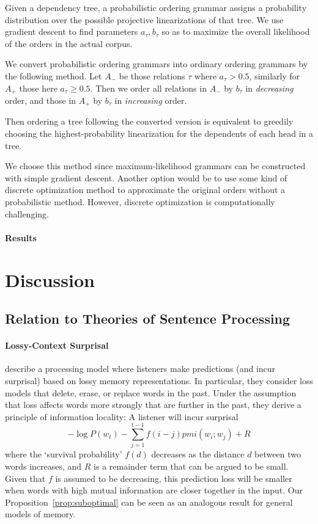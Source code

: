 \documentclass[11pt,letterpaper]{article}
\begin{document}
Given a dependency tree, a probabilistic ordering grammar assigns a probability distribution over the possible projective linearizations of that tree.
We use gradient descent to find parameters $a_\tau, b_\tau$ so as to maximize the overall likelihood of the orders in the actual corpus.


We convert probabilistic ordering grammars into ordinary ordering grammars by the following method.
Let $A_-$ be those relations $\tau$ where $a_\tau > 0.5$, similarly for $A_+$ those here $a_\tau \geq 0.5$.
Then we order all relations in $A_-$ by $b_\tau$ in \emph{decreasing} order, and those in $A_+$ by $b_\tau$ in \emph{increasing} order.

Then ordering a tree following the converted version is equivalent to greedily choosing the highest-probability linearization for the dependents of each head in a tree.


We choose this method since maximum-likelihood grammars can be constructed with simple gradient descent.
Another option would be to use some kind of discrete optimization method to approximate the original orders without a probabilistic method.
However, discrete optimization is computationally challenging.

\paragraph{Results}


\section{Discussion}

\subsection{Relation to Theories of Sentence Processing}


\paragraph{Lossy-Context Surprisal}
\citet{futrell-noisy-context-2017} describe a processing model where listeners make predictions (and incur surprisal) based on lossy memory representations.
In particular, they consider loss models that delete, erase, or replace words in the past.
Under the assumption that loss affects words more strongly that are further in the past, they derive a principle of information locality:
A listener will incur surprisal
$$ -\log P(w_t) - \sum_{j=1}^{t-1} f(i-j) pmi(w_i; w_j) + R$$
where the `survival probability' $f(d)$ decreases as the distance $d$ between two words increases, and $R$ is a remainder term that can be argued to be small.
Given that $f$ is assumed to be decreasing, this prediction loss will be smaller when words with high mutual information are closer together in the input.
Our Proposition~\ref{prop:suboptimal} can be seen as an analogous result for general models of memory.
\end{document}
